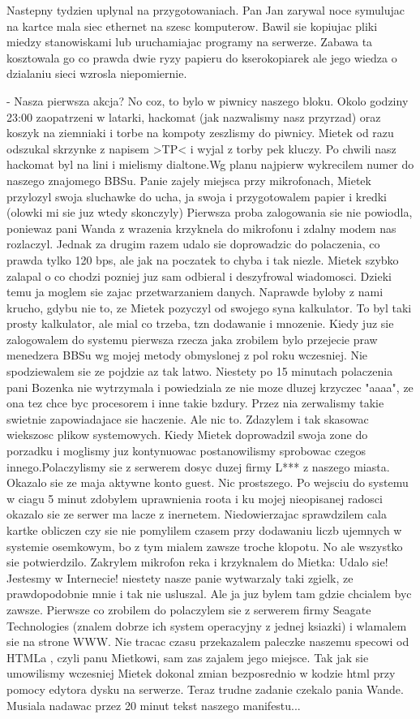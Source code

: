\documentclass[a4paper,polish,titlepage,12pt]{article}
\begin{document}
Nastepny tydzien uplynal na przygotowaniach. Pan Jan zarywal noce symulujac na kartce mala siec ethernet na szesc komputerow. Bawil sie kopiujac pliki miedzy stanowiskami lub uruchamiajac programy na serwerze. Zabawa ta kosztowala go co prawda dwie ryzy papieru do kserokopiarek ale jego wiedza o dzialaniu sieci wzrosla niepomiernie.

- Nasza pierwsza akcja? No coz, to bylo w piwnicy naszego bloku. Okolo godziny 23:00 zaopatrzeni w latarki, hackomat (jak nazwalismy nasz przyrzad) oraz koszyk na ziemniaki i torbe na kompoty zeszlismy do piwnicy. Mietek od razu odszukal skrzynke z napisem >TP< i wyjal z torby pek kluczy. Po chwili nasz hackomat byl na lini i mielismy dialtone.Wg planu najpierw wykrecilem numer do naszego znajomego BBSu. Panie zajely miejsca przy mikrofonach, Mietek przylozyl swoja sluchawke do ucha, ja swoja i przygotowalem papier i kredki (olowki mi sie juz wtedy skonczyly) Pierwsza proba zalogowania sie nie powiodla, poniewaz pani Wanda z wrazenia krzyknela do mikrofonu i zdalny modem nas rozlaczyl. Jednak za drugim razem udalo sie doprowadzic do polaczenia, co prawda tylko 120 bps, ale jak na poczatek to chyba i tak niezle. Mietek szybko zalapal o co chodzi pozniej juz sam odbieral i deszyfrowal wiadomosci. Dzieki temu ja moglem sie zajac przetwarzaniem danych. Naprawde byloby z nami krucho, gdybu nie to, ze Mietek pozyczyl od swojego syna kalkulator. To byl taki prosty kalkulator, ale mial co trzeba, tzn dodawanie i mnozenie. Kiedy juz sie zalogowalem do systemu pierwsza rzecza jaka zrobilem bylo przejecie praw menedzera BBSu wg mojej metody obmyslonej z pol roku wczesniej. Nie spodziewalem sie ze pojdzie az tak latwo. Niestety po 15 minutach polaczenia pani Bozenka nie wytrzymala i powiedziala ze nie moze dluzej krzyczec "aaaa", ze ona tez chce byc procesorem i inne takie bzdury. Przez nia zerwalismy takie swietnie zapowiadajace sie haczenie. Ale nic to. Zdazylem i tak skasowac wiekszosc plikow systemowych. Kiedy Mietek doprowadzil swoja zone do porzadku i moglismy juz kontynuowac postanowilismy sprobowac czegos innego.Polaczylismy sie z serwerem dosyc duzej firmy L*** z naszego miasta. Okazalo sie ze maja aktywne konto guest. Nic prostszego. Po wejsciu do systemu w ciagu 5 minut zdobylem uprawnienia roota i ku mojej nieopisanej radosci okazalo sie ze serwer ma lacze z inernetem. Niedowierzajac sprawdzilem cala kartke obliczen czy sie nie pomylilem czasem przy dodawaniu liczb ujemnych w systemie osemkowym, bo z tym mialem zawsze troche klopotu. No ale wszystko sie potwierdzilo. Zakrylem mikrofon reka i krzyknalem do Mietka: Udalo sie! Jestesmy w Internecie! niestety nasze panie wytwarzaly taki zgielk, ze prawdopodobnie mnie i tak nie usluszal. Ale ja juz bylem tam gdzie chcialem byc zawsze. Pierwsze co zrobilem do polaczylem sie z serwerem firmy Seagate Technologies (znalem dobrze ich system operacyjny z jednej ksiazki) i wlamalem sie na strone WWW. Nie tracac czasu przekazalem paleczke naszemu specowi od HTMLa , czyli panu Mietkowi, sam zas zajalem jego miejsce. Tak jak sie umowilismy wczesniej Mietek dokonal zmian bezposrednio w kodzie html przy pomocy edytora dysku na serwerze. Teraz trudne zadanie czekalo pania Wande. Musiala nadawac przez 20 minut tekst naszego manifestu...
\end{document}
